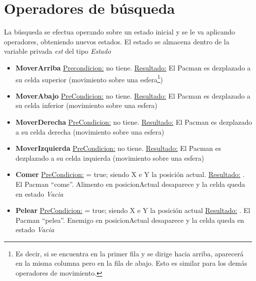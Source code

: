 \section{Operadores de búsqueda}
La búsqueda se efectua operando sobre un estado inicial y se le va aplicando operadores, obteniendo nuevos estados.\newline
El estado se almacena dentro de la variable privada \textit{est} del tipo \textit{Estado}\newline
{}

\begin{itemize}

\item \textbf{MoverArriba}\newline
\underline{Precondicion:} no tiene.\newline
\underline{Resultado:} El Pacman es dezplazado a su celda superior (movimiento
sobre una esfera\footnote{Es decir, si se encuentra en la primer fila y se
dirige hacia arriba, aparecerá en la misma columna pero en la fila de abajo.
Esto es similar para los demás operadores de movimiento.})

\item \textbf{MoverAbajo}\newline
\underline{PreCondicion:}  no tiene.\newline
\underline{Resultado:} El Pacman es dezplazado a su celda inferior (movimiento
sobre una esfera)

\item \textbf{MoverDerecha}\newline
\underline{PreCondicion:}  no tiene.\newline
\underline{Resultado:} El Pacman es dezplazado a su celda derecha (movimiento
sobre una esfera)

\item \textbf{MoverIzquierda}\newline
\underline{PreCondicion:}  no tiene.\newline
\underline{Resultado:} El Pacman es dezplazado a su celda izquierda (movimiento
sobre una esfera)

\item \textbf{Comer}\newline
\underline{PreCondicion:}  = true; siendo X e Y la posición actual.\newline
\underline{Resultado:} . El Pacman ``come''. Alimento en posicionActual desaparece
y la celda queda en estado \textit{Vacia}

\item \textbf{Pelear}\newline
\underline{PreCondicion:}  = true; siendo X e Y la posición actual\newline
\underline{Resultado:} . El Pacman ``pelea''. Enemigo en posicionActual desaparece
y la celda queda en estado \textit{Vacia}

\end{itemize}
